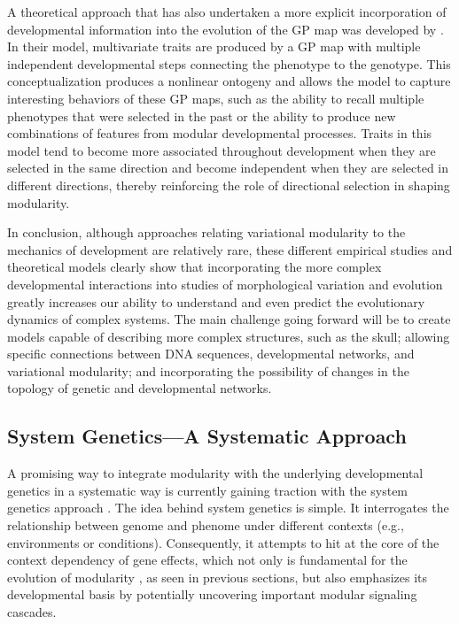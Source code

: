 \begin{refsection}
A theoretical approach that has also undertaken a more explicit
incorporation of developmental information into the evolution of the GP
map was developed by \textcite{Watson2014-pi}. In their model, multivariate traits are produced by a GP map
with multiple independent developmental steps connecting the phenotype
to the genotype. This conceptualization produces a nonlinear ontogeny
and allows the model to capture interesting behaviors of these GP maps,
such as the ability to recall multiple phenotypes that were selected in
the past or the ability to produce new combinations of features from
modular developmental processes. Traits in this model tend to become
more associated throughout development when they are selected in the
same direction and become independent when they are selected in
different directions, thereby reinforcing the role of directional
selection in shaping modularity.

In conclusion, although approaches relating variational modularity to
the mechanics of development are relatively rare, these different
empirical studies and theoretical models clearly show that incorporating
the more complex developmental interactions into studies of
morphological variation and evolution greatly increases our ability to
understand and even predict the evolutionary dynamics of complex
systems. The main challenge going forward will be to create models
capable of describing more complex structures, such as the skull;
allowing specific connections between DNA sequences, developmental
networks, and variational modularity; and incorporating the possibility
of changes in the topology of genetic and developmental networks.

\subsection{System Genetics---A Systematic Approach}

A promising way to integrate modularity with the underlying
developmental genetics in a systematic way is currently gaining traction
with the system genetics approach \parencite{Ayroles2009-ld, Mackay2009-fo}. 
The idea behind
system genetics is simple. It interrogates the relationship between
genome and phenome under different contexts (e.g., environments or
conditions). Consequently, it attempts to hit at the core of the context
dependency of gene effects, which not only is fundamental for the
evolution of modularity \parencite{Pavlicev2015-up}, as seen in previous sections, but also emphasizes its
developmental basis by potentially uncovering important modular
signaling cascades.


\end{refsection}
